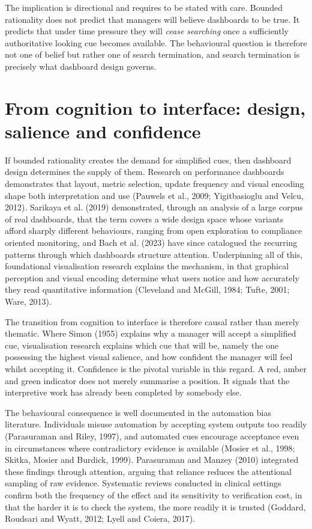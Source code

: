 \documentclass[12pt,a4paper]{article}
\begin{document}
The implication is directional and requires to be stated with care. Bounded rationality does not predict
that managers will believe dashboards to be true. It predicts that under time pressure they will
\emph{cease searching} once a sufficiently authoritative looking cue becomes available. The behavioural
question is therefore not one of belief but rather one of search termination, and search termination is
precisely what dashboard design governs.

\section{From cognition to interface: design, salience and confidence}

If bounded rationality creates the demand for simplified cues, then dashboard design determines
the supply of them. Research on performance dashboards demonstrates that layout, metric selection,
update frequency and visual encoding shape both interpretation and use (Pauwels et al., 2009;
Yigitbasioglu and Velcu, 2012). Sarikaya et al. (2019) demonstrated, through an analysis of a
large corpus of real dashboards, that the term covers a wide design space whose variants afford
sharply different behaviours, ranging from open exploration to compliance oriented monitoring, and
Bach et al. (2023) have since catalogued the recurring patterns through which dashboards structure
attention. Underpinning all of this, foundational visualisation research explains the mechanism,
in that graphical perception and visual encoding determine what users notice and how accurately
they read quantitative information (Cleveland and McGill, 1984; Tufte, 2001; Ware, 2013).

The transition from cognition to interface is therefore causal rather than merely thematic. Where Simon
(1955) explains why a manager will accept a simplified cue, visualisation research explains which cue that
will be, namely the one possessing the highest visual salience, and how confident the manager will feel
whilst accepting it. Confidence is the pivotal variable in this regard. A red, amber and green indicator
does not merely summarise a position. It signals that the interpretive work has already been completed by
somebody else.

The behavioural consequence is well documented in the automation bias literature. Individuals misuse
automation by accepting system outputs too readily (Parasuraman and Riley, 1997), and automated cues
encourage acceptance even in circumstances where contradictory evidence is available (Mosier et al., 1998;
Skitka, Mosier and Burdick, 1999). Parasuraman and Manzey (2010) integrated these findings through
attention, arguing that reliance reduces the attentional sampling of raw evidence. Systematic reviews
conducted in clinical settings confirm both the frequency of the effect and its sensitivity to verification
cost, in that the harder it is to check the system, the more readily it is trusted (Goddard, Roudsari and
Wyatt, 2012; Lyell and Coiera, 2017).
\end{document}
